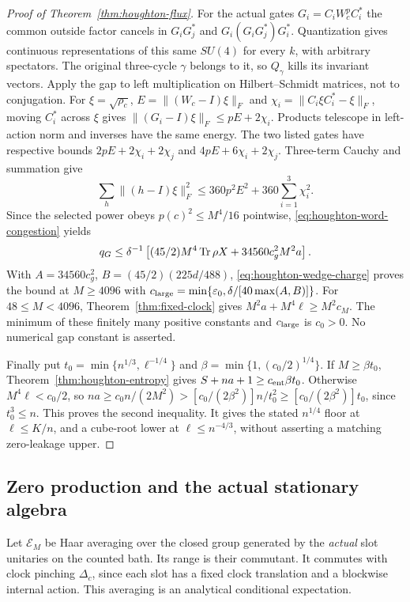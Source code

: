 \begin{proof}[Proof of Theorem~\ref{thm:houghton-flux}]
For the actual gates $G_i=C_iW_c^pC_i^*$ the common outside
factor cancels in $G_iG_j^*$ and $G_i(G_iG_j^*)G_i^*$.
Quantization gives continuous representations of this same $SU(4)$
for every $k$, with arbitrary spectators.
The original three-cycle $\gamma$ belongs to it, so $Q_\gamma$
kills its invariant vectors. Apply the gap to left multiplication
on Hilbert--Schmidt matrices, not to conjugation.
For $\xi=\sqrt{\rho_c}$, $E=\|(W_c-I)\xi\|_F$ and
$\chi_i=\|C_i\xi C_i^*-\xi\|_F$, moving $C_i^*$ across
$\xi$ gives $\|(G_i-I)\xi\|_F\leq pE+2\chi_i$.
Products telescope in left-action norm and inverses have the same
energy. The two listed gates have respective bounds
$2pE+2\chi_i+2\chi_j$ and $4pE+6\chi_i+2\chi_j$.
Three-term Cauchy and summation give
\[
 \sum_h\|(h-I)\xi\|_F^2
       \leq360p^2E^2+360\sum_{i=1}^3\chi_i^2.
\]
Since the selected power obeys $p(c)^2\leq M^4/16$ pointwise,
\eqref{eq:houghton-word-congestion} yields
\[
 q_G\leq\delta^{-1}\left[(45/2)M^4\operatorname{Tr}\rho X
                               +34560c_g^2M^2a\right].
\]
With $A=34560c_g^2$, $B=(45/2)(225d/488)$,
\eqref{eq:houghton-wedge-charge} proves the bound at $M\geq4096$
with $c_{\rm large}=\min\{\varepsilon_0,\delta/[40\max(A,B)]\}$.
For $48\leq M<4096$, Theorem~\ref{thm:fixed-clock} gives
$M^2a+M^4\ell\geq M^2c_M$. The minimum of these finitely
many positive constants and $c_{\rm large}$ is $c_0>0$.
No numerical gap constant is asserted.

Finally put $t_0=\min\{n^{1/3},\ell^{-1/4}\}$ and
$\beta=\min\{1,(c_0/2)^{1/4}\}$.
If $M\geq\beta t_0$, Theorem~\ref{thm:houghton-entropy} gives
$S+na+1\geq c_{\rm ent}\beta t_0$.
Otherwise $M^4\ell<c_0/2$, so
$na\geq c_0n/(2M^2)>[c_0/(2\beta^2)]n/t_0^2
\geq[c_0/(2\beta^2)]t_0$, since $t_0^3\leq n$.
This proves the second inequality. It gives the stated $n^{1/4}$
floor at $\ell\leq K/n$, and a cube-root lower at
$\ell\leq n^{-4/3}$, without asserting a matching zero-leakage upper.
\end{proof}

\subsection{Zero production and the actual stationary algebra}
\label{app:houghton-stationary}

Let $\mathcal E_M$ be Haar averaging over the closed group generated
by the \emph{actual} slot unitaries on the counted bath. Its range is
their commutant. It commutes with clock pinching $\Delta_c$, since
each slot has a fixed clock translation and a blockwise internal action.
This averaging is an analytical conditional expectation.

